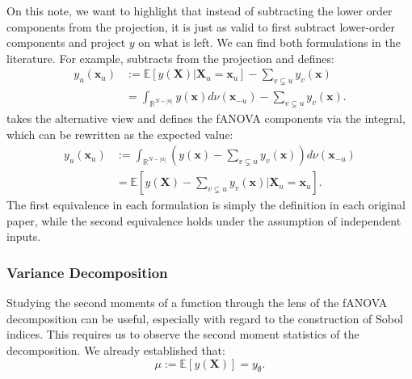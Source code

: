 On this note, we want to highlight that instead of subtracting the lower order components from the projection, it is just as valid to first subtract lower-order components and project $y$ on what is left.
We can find both formulations in the literature.
For example, \cite{muehlenstaedt2012} subtracts from the projection and defines:
\begin{align*}
    y_u(\boldsymbol{x}_u) &:=
    \mathbb{E}[y(\boldsymbol{X}) | \boldsymbol{X}_{u} = \boldsymbol{x}_u] - \sum_{v \subsetneq u} y_v(\boldsymbol{x}) \\
    &= \int_{\mathbb{R}^{N-|u|}} y(\boldsymbol{x}) d \nu(\boldsymbol{x}_{-u}) - \sum_{v \subsetneq u} y_v(\boldsymbol{x}).
\end{align*}
\cite{hooker2004} takes the alternative view and defines the fANOVA components via the integral, which can be rewritten as the expected value:
\begin{align*}
    y_u(\boldsymbol{x}_u)
    &:= \int_{\mathbb{R}^{N-|u|}} (y(\boldsymbol{x}) - \sum_{v \subsetneq u} y_v(\boldsymbol{x})) d \nu(\boldsymbol{x}_{-u}) \\
    &= \mathbb{E}[y(\boldsymbol{X}) - \sum_{v \subsetneq u} y_v(\boldsymbol{x}) | \boldsymbol{X}_{u} = \boldsymbol{x}_u ].
\end{align*}
The first equivalence in each formulation is simply the definition in each original paper, while the second equivalence holds under the assumption of independent inputs.


\subsubsection{Variance Decomposition}
Studying the second moments of  a function through the lens of the fANOVA decomposition can be useful, especially with regard to the construction of Sobol indices. This requires us to observe the second moment statistics of the decomposition. We already established that:
$$ \mu := \mathbb{E}[y(\boldsymbol{X})] = y_{\emptyset}.$$

